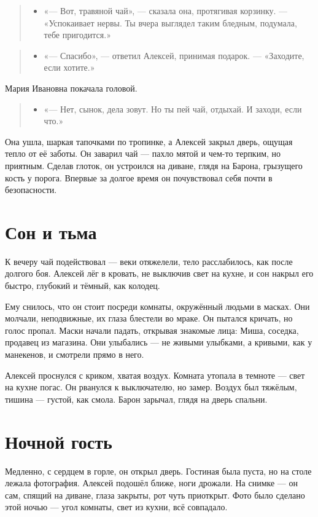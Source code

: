 \documentclass[12pt,a4paper]{book}
\newenvironment{dialogue}{\begin{quote}\itshape\begin{itemize}\item[]}{\end{itemize}\end{quote}}
\begin{document}
\begin{dialogue}
«— Вот, травяной чай», — сказала она, протягивая корзинку. — «Успокаивает нервы. Ты вчера выглядел таким бледным, подумала, тебе пригодится.»
\end{dialogue}

\begin{dialogue}
«— Спасибо», — ответил Алексей, принимая подарок. — «Заходите, если хотите.»
\end{dialogue}

Мария Ивановна покачала головой.

\begin{dialogue}
«— Нет, сынок, дела зовут. Но ты пей чай, отдыхай. И заходи, если что.»
\end{dialogue}

Она ушла, шаркая тапочками по тропинке, а Алексей закрыл дверь, ощущая тепло от её заботы. Он заварил чай — пахло мятой и чем-то терпким, но приятным. Сделав глоток, он устроился на диване, глядя на Барона, грызущего кость у порога. Впервые за долгое время он почувствовал себя почти в безопасности.

\section{Сон и тьма}

К вечеру чай подействовал — веки отяжелели, тело расслабилось, как после долгого боя. Алексей лёг в кровать, не выключив свет на кухне, и сон накрыл его быстро, глубокий и тёмный, как колодец.

Ему снилось, что он стоит посреди комнаты, окружённый людьми в масках. Они молчали, неподвижные, их глаза блестели во мраке. Он пытался кричать, но голос пропал. Маски начали падать, открывая знакомые лица: Миша, соседка, продавец из магазина. Они улыбались — не живыми улыбками, а кривыми, как у манекенов, и смотрели прямо в него.

Алексей проснулся с криком, хватая воздух. Комната утопала в темноте — свет на кухне погас. Он рванулся к выключателю, но замер. Воздух был тяжёлым, тишина — густой, как смола. Барон зарычал, глядя на дверь спальни.

\section{Ночной гость}

Медленно, с сердцем в горле, он открыл дверь. Гостиная была пуста, но на столе лежала фотография. Алексей подошёл ближе, ноги дрожали. На снимке — он сам, спящий на диване, глаза закрыты, рот чуть приоткрыт. Фото было сделано этой ночью — угол комнаты, свет из кухни, всё совпадало.
\end{document}
